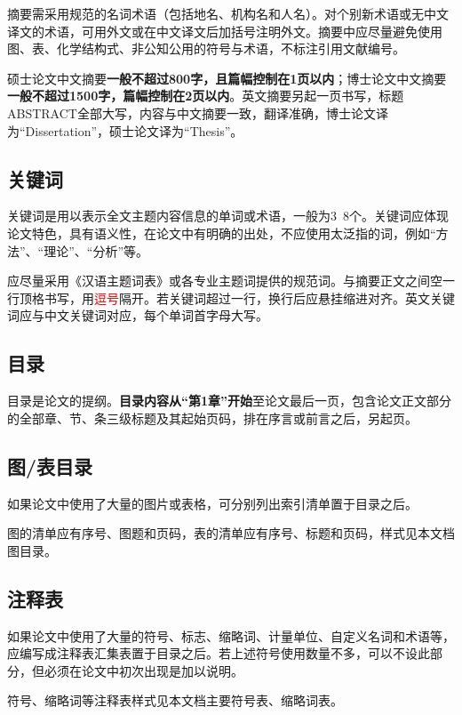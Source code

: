 摘要需采用规范的名词术语（包括地名、机构名和人名）。对个别新术语或无中文译文的术语，可用外文或在中文译文后加括号注明外文。摘要中应尽量避免使用图、表、化学结构式、非公知公用的符号与术语，不标注引用文献编号。

硕士论文中文摘要\textbf{一般不超过800字，且篇幅控制在1页以内}；博士论文中文摘要\textbf{一般不超过1500字，篇幅控制在2页以内}。英文摘要另起一页书写，标题ABSTRACT全部大写，内容与中文摘要一致，翻译准确，博士论文译为“Dissertation”，硕士论文译为“Thesis”。

\subsection{关键词}

关键词是用以表示全文主题内容信息的单词或术语，一般为3~8个。关键词应体现论文特色，具有语义性，在论文中有明确的出处，不应使用太泛指的词，例如“方法”、“理论”、“分析”等。

应尽量采用《汉语主题词表》或各专业主题词提供的规范词。与摘要正文之间空一行顶格书写，用\textcolor{red}{逗号}隔开。若关键词超过一行，换行后应悬挂缩进对齐。英文关键词应与中文关键词对应，每个单词首字母大写。

\subsection{目录}

目录是论文的提纲。\textbf{目录内容从“第1章”开始}至论文最后一页，包含论文正文部分的全部章、节、条三级标题及其起始页码，排在序言或前言之后，另起页。

\subsection{图/表目录}

如果论文中使用了大量的图片或表格，可分别列出索引清单置于目录之后。

图的清单应有序号、图题和页码，表的清单应有序号、标题和页码，样式见本文档图目录。

\subsection{注释表}

如果论文中使用了大量的符号、标志、缩略词、计量单位、自定义名词和术语等，应编写成注释表汇集表置于目录之后。若上述符号使用数量不多，可以不设此部分，但必须在论文中初次出现是加以说明。

符号、缩略词等注释表样式见本文档主要符号表、缩略词表。

